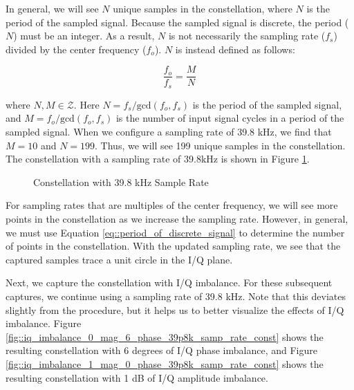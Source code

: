\documentclass{article}
\begin{document}
In general, we will see $N$ unique samples in the constellation, where $N$ is the period of the sampled signal. Because the sampled signal is discrete, the period ($N$) must be an integer. As a result, $N$ is not necessarily the sampling rate ($f_s$) divided by the center frequency ($f_o$). $N$ is instead defined as follows:

\begin{equation}
	\frac{f_o}{f_s} = \frac{M}{N} \label{eq::period_of_discrete_signal}
\end{equation}

where $N, M \in \mathcal{Z}$. Here $N=f_s/\text{gcd}(f_o,f_s)$ is the period of the sampled signal, and $M=f_o/\text{gcd}(f_o,f_s)$ is the number of input signal cycles in a period of the sampled signal. When we configure a sampling rate of 39.8 kHz, we find that $M=10$ and $N=199$. Thus, we will see 199 unique samples in the constellation. The constellation with a sampling rate of 39.8kHz is shown in Figure \ref{fig::iq_imbalance_0_mag_0_phase_39p8k_samp_rate_const}.

\begin{figure}[H]
	\centerline{}
	\caption{Constellation with 39.8 kHz Sample Rate}
	\label{fig::iq_imbalance_0_mag_0_phase_39p8k_samp_rate_const}
\end{figure}

For sampling rates that are multiples of the center frequency, we will see more points in the constellation as we increase the sampling rate. However, in general, we must use Equation \ref{eq::period_of_discrete_signal} to determine the number of points in the constellation. With the updated sampling rate, we see that the captured samples trace a unit circle in the I/Q plane.

Next, we capture the constellation with I/Q imbalance. For these subsequent captures, we continue using a sampling rate of 39.8 kHz. Note that this deviates slightly from the procedure, but it helps us to better visualize the effects of I/Q imbalance. Figure \ref{fig::iq_imbalance_0_mag_6_phase_39p8k_samp_rate_const} shows the resulting constellation with 6 degrees of I/Q phase imbalance, and Figure \ref{fig::iq_imbalance_1_mag_0_phase_39p8k_samp_rate_const} shows the resulting constellation with 1 dB of I/Q amplitude imbalance.
\end{document}
